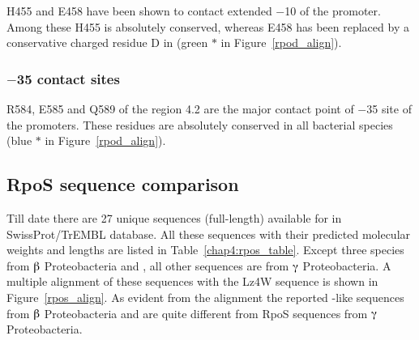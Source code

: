 H455 and E458 have been shown to contact extended $-$10 of the
promoter. Among these H455 is absolutely conserved, whereas E458
has been replaced by a conservative charged residue D in
 (green $\ast$ in Figure~\ref{rpod_align}).

\subsubsection{$-$35 contact sites}

R584, E585 and Q589 of the region 4.2 are the major contact point
of $-$35 site of the promoters. These residues are absolutely
conserved in all bacterial species (blue $\ast$ in
Figure~\ref{rpod_align}).


\subsection{RpoS sequence comparison}

Till date there are 27 unique sequences (full-length) available
for \sigs{} in SwissProt/TrEMBL database. All these sequences with
their predicted molecular weights and lengths are listed in
Table~\ref{chap4:rpos_table}. Except three species from $\betaup$
Proteobacteria and , all other sequences are from
$\gammaup$ Proteobacteria. A multiple alignment of these sequences
with the Lz4W sequence is shown in Figure~\ref{rpos_align}. As
evident from the alignment the reported -like sequences
from $\betaup$ Proteobacteria and  are quite different
from RpoS sequences from $\gammaup$ Proteobacteria.

